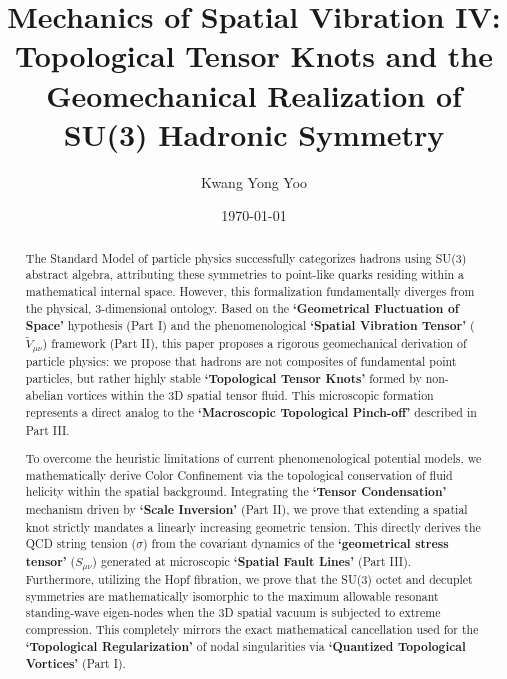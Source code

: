 \documentclass[reprint,amsmath,amssymb,aps,prd]{revtex4-2}
\begin{document}

\title{Mechanics of Spatial Vibration IV: Topological Tensor Knots and the Geomechanical Realization of SU(3) Hadronic Symmetry}

\author{Kwang Yong Yoo}

\date{\today}

\begin{abstract}
The Standard Model of particle physics successfully categorizes hadrons using SU(3) abstract algebra, attributing these symmetries to point-like quarks residing within a mathematical internal space. However, this formalization fundamentally diverges from the physical, 3-dimensional ontology. Based on the \textbf{`Geometrical Fluctuation of Space'} hypothesis (Part I) and the phenomenological \textbf{`Spatial Vibration Tensor'} ($\tilde{V}_{\mu\nu}$) framework (Part II), this paper proposes a rigorous geomechanical derivation of particle physics: we propose that hadrons are not composites of fundamental point particles, but rather highly stable \textbf{`Topological Tensor Knots'} formed by non-abelian vortices within the 3D spatial tensor fluid. This microscopic formation represents a direct analog to the \textbf{`Macroscopic Topological Pinch-off'} described in Part III.

To overcome the heuristic limitations of current phenomenological potential models, we mathematically derive Color Confinement via the topological conservation of fluid helicity within the spatial background. Integrating the \textbf{`Tensor Condensation'} mechanism driven by \textbf{`Scale Inversion'} (Part II), we prove that extending a spatial knot strictly mandates a linearly increasing geometric tension. This directly derives the QCD string tension ($\sigma$) from the covariant dynamics of the \textbf{`geometrical stress tensor'} ($S_{\mu\nu}$) generated at microscopic \textbf{`Spatial Fault Lines'} (Part III). Furthermore, utilizing the Hopf fibration, we prove that the SU(3) octet and decuplet symmetries are mathematically isomorphic to the maximum allowable resonant standing-wave eigen-nodes when the 3D spatial vacuum is subjected to extreme compression. This completely mirrors the exact mathematical cancellation used for the \textbf{`Topological Regularization'} of nodal singularities via \textbf{`Quantized Topological Vortices'} (Part I).


\end{abstract}
\end{document}
